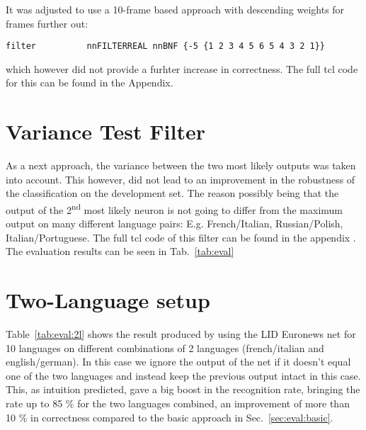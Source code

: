 It was adjusted to use a 10-frame based approach with descending weights for frames further out:
\begin{verbatim}
filter          nnFILTERREAL nnBNF {-5 {1 2 3 4 5 6 5 4 3 2 1}}
\end{verbatim}
which however did not provide a furhter increase in correctness. The full tcl code for this can be found in the Appendix.


\section{Variance Test Filter}
\label{sec:eval:variance}
As a next approach, the variance between the two most likely outputs was taken into account. This however, did not lead to an improvement in the robustness of the classification on the development set. The reason possibly being that the output of the 2\textsuperscript{nd} most likely neuron is not going to differ from the maximum output on many different language pairs: E.g. French/Italian, Russian/Polish, Italian/Portuguese. The full tcl code of this filter can be found in the appendix . The evaluation results can be seen in Tab.~\ref{tab:eval}

\section{Two-Language setup}
\label{sec:eval:2L}
Table~\ref{tab:eval:2l} shows the result produced by using the LID Euronews net for 10 languages on different combinations of 2 languages (french/italian and english/german). In this case we ignore the output of the net if it doesn't equal one of the two languages and instead keep the previous output intact in this case. This, as intuition predicted, gave a big boost in the recognition rate, bringing the rate up to 85 \% for the two languages combined, an improvement of more than 10 \% in correctness compared to the basic approach in Sec.~\ref{sec:eval:basic}.

	